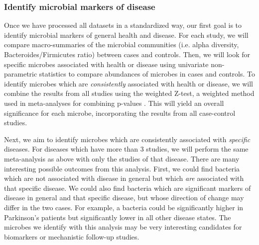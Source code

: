 \documentclass[12pt]{article}
\begin{document}
\subsubsection{Identify microbial markers of disease}\label{sec:indep_studies}
Once we have processed all datasets in a standardized way, our first 
goal is to identify microbial markers of general health and disease. 
For each study, we will compare macro-summaries of the microbial communities
(i.e. alpha diversity, Bacteroides/Firmicutes ratio) between cases and controls.
Then, we will look for specific microbes associated with health or disease using
univariate non-parametric statistics to compare abundances of microbes in cases
and controls. To identify microbes which are \textit{consistently} associated with
health or disease, we will combine the results from all studies using 
the weighted Z-test, a weighted method used in meta-analyses for combining p-values \cite{zavkin-ztest-2011}. 
This will yield an overall significance for each microbe,
incorporating the results from all case-control studies.

Next, we aim to identify microbes which are consistently associated with \textit{specific}
diseases. For diseases which have more than 3 studies, we will
perform the same meta-analysis as above with only the studies
of that disease. There are many interesting possible outcomes from this analysis.
First, we could find bacteria which are not associated with disease in general 
but which \textit{are} associated with that specific disease. 
We could also find bacteria which are significant markers of disease in general and 
that specific disease, but whose direction of change may differ in the two cases.
For example, a bacteria could be significantly higher in Parkinson's patients but
significantly lower in all other disease states. The microbes we identify with this
analysis may be very interesting candidates for biomarkers or mechanistic follow-up studies.
\end{document}
